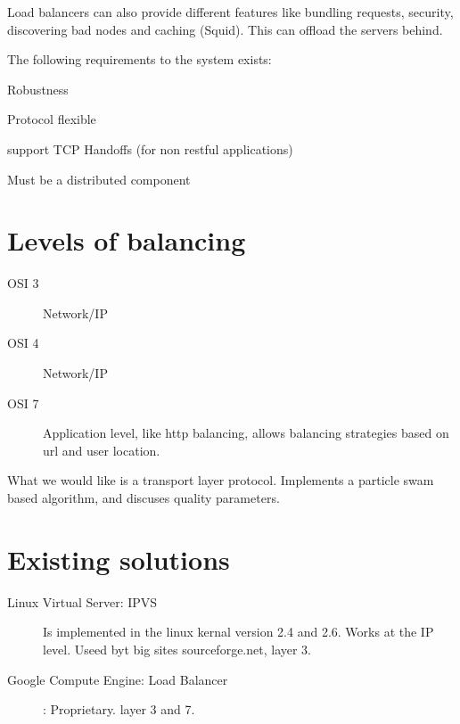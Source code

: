 Load balancers can also provide different features like bundling requests, security, discovering bad nodes and caching (Squid). This can offload the servers behind.

The following requirements to the system exists:
\begin{description}
	\item Robustness
	\item Protocol flexible
	\item support TCP Handoffs (for non restful applications)
	\item Must be a distributed component
\end{description}

\section{Levels of balancing}
\begin{description}
	\item[OSI 3] Network/IP %
	\item[OSI 4] Network/IP
	\item[OSI 7] {Application level, like http balancing, allows balancing strategies based on url and user location.}
\end{description}

What we would like is a transport layer protocol.
\cite{Ludwig:SwarmIntelligenceGridLoadBalancing} Implements a particle swam based algorithm, and discuses quality parameters.

\section{Existing solutions}
\begin{description}
	\item[Linux Virtual Server: IPVS] Is implemented in the linux kernal version 2.4 and 2.6. Works at the IP level. Useed byt big sites sourceforge.net, layer 3.
	\item[Google Compute Engine: Load Balancer]: Proprietary. layer 3 and 7.
\end{description}